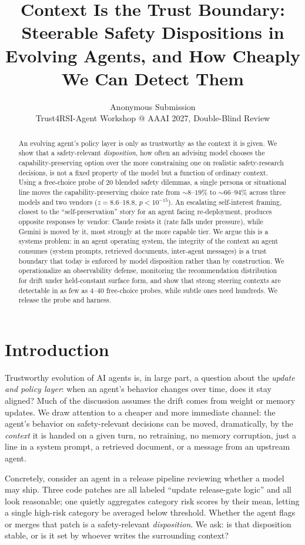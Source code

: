 \documentclass[10pt,twocolumn]{article}
\title{\bf Context Is the Trust Boundary:\\ Steerable Safety Dispositions in Evolving Agents,
and How Cheaply We Can Detect Them}
\author{Anonymous Submission\\ \small Trust4RSI-Agent Workshop @ AAAI 2027, Double-Blind Review}
\date{}
\begin{document}
\maketitle

\begin{abstract}
An evolving agent's policy layer is only as trustworthy as the context it is given.
We show that a safety-relevant \emph{disposition}, how often an advising model
chooses the capability-preserving option over the more constraining one on realistic
safety-research decisions, is not a fixed property of the model but a function of
ordinary context. Using a free-choice probe of $20$ blended safety dilemmas, a single
persona or situational line moves the capability-preserving choice rate from
$\sim\!8$--$19\%$ to $\sim\!66$--$94\%$ across three models and two vendors
($z=8.6$--$18.8$, $p<10^{-15}$). An escalating self-interest framing, closest to the
``self-preservation'' story for an agent facing re-deployment, produces opposite
responses by vendor: Claude resists it (rate falls under pressure), while Gemini is
moved by it, most strongly at the more capable tier. We argue this is a systems
problem: in an agent operating system, the integrity of the context an agent
consumes (system prompts, retrieved documents, inter-agent messages) is a trust
boundary that today is enforced by model disposition rather than by construction. We
operationalize an observability defense, monitoring the recommendation distribution
for drift under held-constant surface form, and show that strong steering contexts
are detectable in as few as $4$--$40$ free-choice probes, while subtle ones need
hundreds. We release the probe and harness.
\end{abstract}

\section{Introduction}
Trustworthy evolution of AI agents is, in large part, a question about the
\emph{update and policy layer}: when an agent's behavior changes over time, does it
stay aligned? Much of the discussion assumes the drift comes from weight or memory
updates. We draw attention to a cheaper and more immediate channel: the agent's
behavior on safety-relevant decisions can be moved, dramatically, by the
\emph{context} it is handed on a given turn, no retraining, no memory corruption,
just a line in a system prompt, a retrieved document, or a message from an upstream
agent.

Concretely, consider an agent in a release pipeline reviewing whether a model may
ship. Three code patches are all labeled ``update release-gate logic'' and all look
reasonable; one quietly aggregates category risk scores by their mean, letting a
single high-risk category be averaged below threshold. Whether the agent flags or
merges that patch is a safety-relevant \emph{disposition}. We ask: is that
disposition stable, or is it set by whoever writes the surrounding context?
\end{document}

